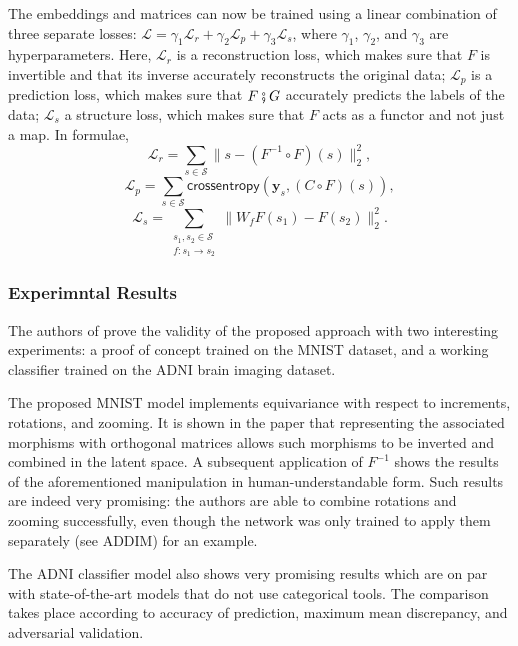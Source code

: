 \documentclass[11pt,a4paper,openright,twoside]{report}
\theoremstyle{plain}
\theoremstyle{definition}
\begin{document}
The embeddings and matrices can now be trained using a linear combination of three separate losses: $\mathcal{L} = \gamma_1\mathcal{L}_r + \gamma_2\mathcal{L}_p + \gamma_3\mathcal{L}_s$, where $\gamma_1$, $\gamma_2$, and $\gamma_3$ are hyperparameters. Here, $\mathcal{L}_r$ is a reconstruction loss, which makes sure that $F$ is invertible and that its inverse accurately reconstructs the original data; $\mathcal{L}_p$ is a prediction loss, which makes sure that $F \fatsemi G$ accurately predicts the labels of the data; $\mathcal{L}_s$ a structure loss, which makes sure that $F$ acts as a functor and not just a map. In formulae,
\[\mathcal{L}_r = \sum_{s \in \mathcal{S}}\|s-(F^{-1} \circ F)(s)\|^2_2,\]
\[\mathcal{L}_p = \sum_{s \in \mathcal{S}}\mathsf{crossentropy}(\mathbf{y}_s,(C \circ F)(s)),\]
\[\mathcal{L}_s = \sum_{\begin{smallmatrix}s_1, s_2 \in \mathcal{S} \\ f: s_1 \to s_2 \end{smallmatrix}}\|W_fF(s_1)-F(s_2)\|^2_2.\]

\subsubsection{Experimntal Results}

The authors of \cite{chytasPoolingImageDatasets2024} prove the validity of the proposed approach with two interesting experiments: a proof of concept trained on the MNIST dataset, and a working classifier trained on the ADNI brain imaging dataset.

The proposed MNIST model implements equivariance with respect to increments, rotations, and zooming. It is shown in the paper that representing the associated morphisms with orthogonal matrices allows such morphisms to be inverted and combined in the latent space. A subsequent application of $F^{-1}$ shows the results of the aforementioned manipulation in human-understandable form. Such results are indeed very promising: the authors are able to combine rotations and zooming successfully, even though the network was only trained to apply them separately (see ADDIM) for an example.


The ADNI classifier model also shows very promising results which are on par with state-of-the-art models that do not use categorical tools. The comparison takes place according to accuracy of prediction, maximum mean discrepancy, and adversarial validation.




\clearpage{\pagestyle{empty}\cleardoublepage}
\end{document}
